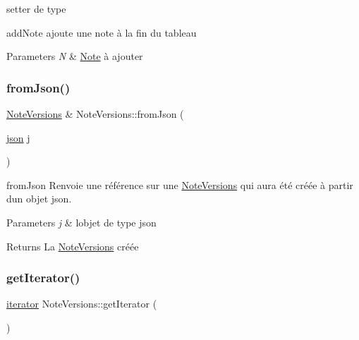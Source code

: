 setter de type 

add\+Note ajoute une note à la fin du tableau 
\begin{DoxyParams}{Parameters}
{\em N} & \hyperlink{classNote}{Note} à ajouter \\
\hline
\end{DoxyParams}
\mbox{\label{classNoteVersions_ac3bcced08e0e7b8afb62514e1f828abb}} 
\subsubsection{\texorpdfstring{from\+Json()}{fromJson()}}
{\footnotesize\ttfamily \hyperlink{classNoteVersions}{Note\+Versions} \& Note\+Versions\+::from\+Json (\begin{DoxyParamCaption}\item[{\hyperlink{classnlohmann_1_1basic__json}{json}}]{j }\end{DoxyParamCaption})\hspace{0.3cm}{\ttfamily [static]}}



from\+Json Renvoie une référence sur une \hyperlink{classNoteVersions}{Note\+Versions} qui aura été créée à partir d\textquotesingle{}un objet json. 


\begin{DoxyParams}{Parameters}
{\em j} & l\textquotesingle{}objet de type json \\
\hline
\end{DoxyParams}
\begin{DoxyReturn}{Returns}
La \hyperlink{classNoteVersions}{Note\+Versions} créée 
\end{DoxyReturn}
\mbox{\label{classNoteVersions_ad7531c8a160453b440f7d8194fe5c404}} 
\subsubsection{\texorpdfstring{get\+Iterator()}{getIterator()}}
{\footnotesize\ttfamily \hyperlink{classNoteVersions_1_1iterator}{iterator} Note\+Versions\+::get\+Iterator (\begin{DoxyParamCaption}{ }\end{DoxyParamCaption})\hspace{0.3cm}{\ttfamily [inline]}}



